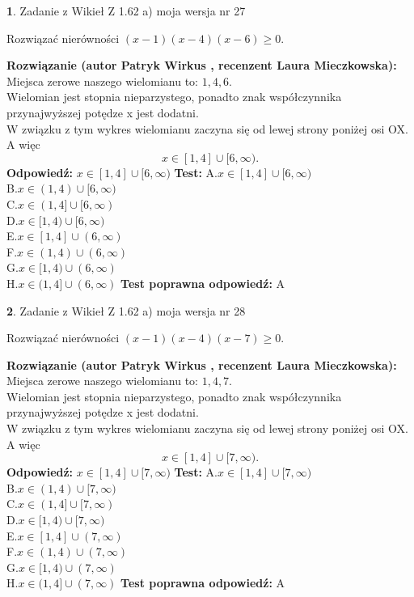 \documentclass[12pt, a4paper]{article}
\theoremstyle{definition} %
\newtheorem{zad}{}
\newcommand{\zadStart}[1]{\begin{zad}#1\newline}
\newcommand{\zadStop}{\end{zad}}
\newcommand{\rozwStart}[2]{\noindent \textbf{Rozwiązanie (autor #1 , recenzent #2): }\newline}
\newcommand{\rozwStop}{\newline}
\newcommand{\odpStart}{\noindent \textbf{Odpowiedź:}\newline}
\newcommand{\odpStop}{\newline}
\newcommand{\testStart}{\noindent \textbf{Test:}\newline}
\newcommand{\testStop}{\newline}
\newcommand{\kluczStart}{\noindent \textbf{Test poprawna odpowiedź:}\newline}
\newcommand{\kluczStop}{\newline}
\begin{document}
\zadStart{Zadanie z Wikieł Z 1.62 a) moja wersja nr 27}

Rozwiązać nierówności $(x-1)(x-4)(x-6)\ge0$.
\zadStop
\rozwStart{Patryk Wirkus}{Laura Mieczkowska}
Miejsca zerowe naszego wielomianu to: $1, 4, 6$.\\
Wielomian jest stopnia nieparzystego, ponadto znak współczynnika przy\linebreak najwyższej potędze x jest dodatni.\\ W związku z tym wykres wielomianu zaczyna się od lewej strony poniżej osi OX. A więc $$x \in [1,4] \cup [6,\infty).$$
\rozwStop
\odpStart
$x \in [1,4] \cup [6,\infty)$
\odpStop
\testStart
A.$x \in [1,4] \cup [6,\infty)$\\
B.$x \in (1,4) \cup [6,\infty)$\\
C.$x \in (1,4] \cup [6,\infty)$\\
D.$x \in [1,4) \cup [6,\infty)$\\
E.$x \in [1,4] \cup (6,\infty)$\\
F.$x \in (1,4) \cup (6,\infty)$\\
G.$x \in [1,4) \cup (6,\infty)$\\
H.$x \in (1,4] \cup (6,\infty)$
\testStop
\kluczStart
A
\kluczStop



\zadStart{Zadanie z Wikieł Z 1.62 a) moja wersja nr 28}

Rozwiązać nierówności $(x-1)(x-4)(x-7)\ge0$.
\zadStop
\rozwStart{Patryk Wirkus}{Laura Mieczkowska}
Miejsca zerowe naszego wielomianu to: $1, 4, 7$.\\
Wielomian jest stopnia nieparzystego, ponadto znak współczynnika przy\linebreak najwyższej potędze x jest dodatni.\\ W związku z tym wykres wielomianu zaczyna się od lewej strony poniżej osi OX. A więc $$x \in [1,4] \cup [7,\infty).$$
\rozwStop
\odpStart
$x \in [1,4] \cup [7,\infty)$
\odpStop
\testStart
A.$x \in [1,4] \cup [7,\infty)$\\
B.$x \in (1,4) \cup [7,\infty)$\\
C.$x \in (1,4] \cup [7,\infty)$\\
D.$x \in [1,4) \cup [7,\infty)$\\
E.$x \in [1,4] \cup (7,\infty)$\\
F.$x \in (1,4) \cup (7,\infty)$\\
G.$x \in [1,4) \cup (7,\infty)$\\
H.$x \in (1,4] \cup (7,\infty)$
\testStop
\kluczStart
A
\kluczStop
\end{document}
